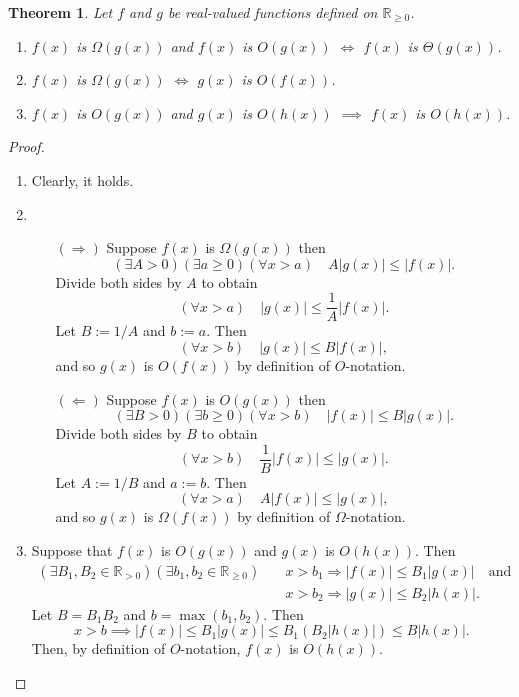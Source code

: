 \documentclass[12pt,openany]{book}
\newtheorem{theorem}{Theorem}[chapter]
\theoremstyle{definition}
\newcommand{\R}{\mathbb{R}}
\newcommand{\abss}[1]{\lvert #1 \rvert}
\begin{document}
	\newpage
	\begin{tcolorbox}[colframe=thmcolor,title={\color{white}\bf }]
		\begin{theorem}
			Let \(f\) and \(g\) be real-valued functions defined on \(\R_{\geq 0}\).
			\begin{enumerate}[(1)]
				\item \(f(x)\) is \(\Omega(g(x))\) and \(f(x)\) is \(O(g(x))\) $\iff$ \(f(x)\) is \(\Theta(g(x))\).
				\item $f(x)$ is \(\Omega(g(x))\) $\iff$ $g(x)$ is $O(f(x))$.
				\item $f(x)$ is $O(g(x))$ and $g(x)$ is $O(h(x))$ $\implies$ $f(x)$ is $O(h(x))$.
			\end{enumerate}
		\end{theorem}
	\end{tcolorbox}
	\begin{proof}
		\begin{enumerate}[(1)]
			\item Clearly, it holds.
			\item \begin{itemize}
				\item[$(\Rightarrow)$] Suppose \(f(x)\) is \(\Omega(g(x))\) then \[
				(\exists A>0)(\exists a\geq0)(\forall x>a)\quad A\abss{g(x)}\leq\abss{f(x)}.
				\] Divide both sides by \(A\) to obtain \[
				(\forall x>a)\quad \abss{g(x)}\leq\frac{1}{A}\abss{f(x)}.
				\] Let $B:=1/A$ and $b:=a$. Then \[
				(\forall x>b)\quad\abss{g(x)}\leq B\abss{f(x)},
				\] and so \(g(x)\) is \(O(f(x))\) by definition of $O$-notation.
				\vspace{4pt}
				\item[$(\Leftarrow)$] Suppose \(f(x)\) is \(O(g(x))\) then \[
				(\exists B>0)(\exists b\geq0)(\forall x>b)\quad \abss{f(x)}\leq B\abss{g(x)}.
				\] Divide both sides by \(B\) to obtain \[
				(\forall x>b)\quad \frac{1}{B}\abss{f(x)}\leq\abss{g(x)}.
				\] Let $A:=1/B$ and $a:=b$. Then \[
				(\forall x>a)\quad A\abss{f(x)}\leq \abss{g(x)},
				\] and so \(g(x)\) is \(\Omega(f(x))\) by definition of $\Omega$-notation.
			\end{itemize}
			\item Suppose that $f(x)$ is $O(g(x))$ and $g(x)$ is $O(h(x))$. Then 
			\begin{align*}
				(\exists B_1,B_2\in\R_{>0})(\exists b_1,b_2\in\R_{\geq 0})\quad &x>b_1\Rightarrow\abss{f(x)}\leq B_1\abss{g(x)}\quad\text{and}\\ &x>b_2\Rightarrow\abss{g(x)}\leq B_2\abss{h(x)}.
			\end{align*}
			Let $B=B_1B_2$ and \(b=\max(b_1,b_2)\). Then \[
			x>b\implies\abss{f(x)}\leq B_1\abss{g(x)}\leq B_1(B_2|h(x)|)\leq B|h(x)|.
			\] Then, by definition of $O$-notation, $f(x)$ is $O(h(x))$.
		\end{enumerate}
	\end{proof}
	
\end{document}
